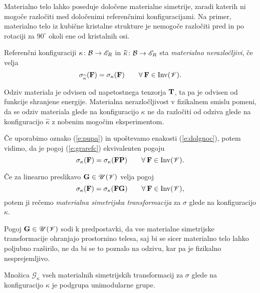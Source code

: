 Materialno telo lahko poseduje določene materialne simetrije, zaradi katerih ni mogoče razločiti
med določenimi referenčnimi konfiguracijami. Na primer, materialno telo iz
kubične kristalne strukture je nemogoče razločiti pred in po rotaciji za
$90^{\circ}$ okoli ene od kristalnih osi.

\begin{definicija}
	Referenčni konfiguraciji $\kappa\colon\mathcal B\to\mathscr E_R$ in $\widehat{\kappa}\colon\mathcal B\to\mathscr E_R$
	sta \emph{materialno nerazločljivi}, če velja
	\begin{equation} \label{e:grarefc}
		\sigma_{\widehat{\kappa}}(\mathbf F)=\sigma_{\kappa}(\mathbf F)
		\qquad\forall\:\mathbf F\in\mathrm{Inv}(\mathscr V).
	\end{equation}
\end{definicija}

Odziv materiala je odvisen od napetostnega tenzorja $\mathbf T$, ta pa je odvisen
od funkcije shranjene energije.
Materialna nerazločljivost v fizikalnem smislu pomeni, da se odziv materiala
glede na konfiguracijo $\kappa$ ne da razločiti od odziva glede na konfiguracijo
$\widehat{\kappa}$ z nobenim mogočim eksperimentom.

Če uporabimo oznako (\ref{e:pupa}) in upoštevamo enakosti (\ref{e:dolgnoc}),
potem vidimo, da je pogoj (\ref{e:grarefc}) ekvivalenten pogoju
\begin{equation*}
	\sigma_{\kappa}(\mathbf F)=\sigma_{\kappa}(\mathbf F\mathbf P)\qquad
	\forall\:\mathbf F\in\mathrm{Inv}(\mathscr V).
\end{equation*}

\begin{definicija}
	Če za linearno preslikavo $\mathbf G\in\mathscr{U}(\mathscr V)$ velja pogoj
	\begin{equation} \label{e:pogir}
		\sigma_{\kappa}(\mathbf F)=\sigma_{\kappa}(\mathbf F\mathbf G)\qquad
		\forall\:\mathbf F\in\mathrm{Inv}(\mathscr V),
	\end{equation}
	potem ji rečemo \emph{materialna simetrijska transformacija} za $\sigma$ glede na konfiguracijo $\kappa$.
\end{definicija}

Pogoj $\mathbf G\in\mathscr{U}(\mathscr V)$ sodi k predpostavki,
da vse materialne simetrijske transformacije ohranjajo prostornino telesa,
saj bi se sicer materialno telo lahko poljubno razši\-rilo, ne da bi se to poznalo na odzivu,
kar pa je fizikalno nesprejemljivo.

\begin{izrek}
	Množica $\mathcal{G}_{\kappa}$ vseh materialnih simetrijskih transformacij za $\sigma$ glede
	na konfiguracijo $\kappa$ je podgrupa unimodularne grupe.
\end{izrek}

